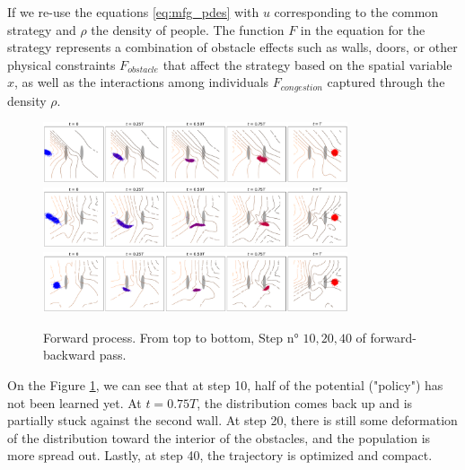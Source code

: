 \documentclass{article}
\begin{document}
If we re-use the equations \eqref{eq:mfg_pdes}
with $u$ corresponding to the common strategy and $\rho$ the density of people. The function $F$ in the equation for the strategy represents a combination of obstacle effects such as walls, doors, or other physical constraints $F_{obstacle}$ that affect the strategy based on the spatial variable $x$, as well as the interactions among individuals $F_{congestion}$ captured through the density $\rho$.

\begin{figure}[h]
    \centering
    \includegraphics[width=0.8\textwidth]{Figures/stage10_double.pdf}
    \\
    \includegraphics[width=0.8\textwidth]{Figures/stage20_double.pdf}
    \\
    \includegraphics[width=0.8\textwidth]{Figures/stage40_double.pdf}
    \caption{Forward process. From top to bottom, Step n° $10, 20, 40$ of forward-backward pass.}
    \label{fig:fb_pass}
\end{figure}

On the Figure \ref{fig:fb_pass}, we can see that at step 10, half of the potential ("policy") has not been learned yet. At $t = 0.75T$, the distribution comes back up and is partially stuck against the second wall. At step 20, there is still some deformation of the distribution toward the interior of the obstacles, and the population is more spread out. Lastly, at step 40, the trajectory is optimized and compact.
\end{document}
